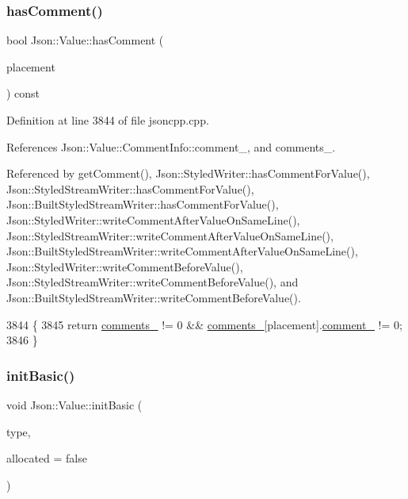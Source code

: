 \subsubsection{\texorpdfstring{has\+Comment()}{hasComment()}}
{\footnotesize\ttfamily bool Json\+::\+Value\+::has\+Comment (\begin{DoxyParamCaption}\item[{\hyperlink{namespace_json_a4fc417c23905b2ae9e2c47d197a45351}{Comment\+Placement}}]{placement }\end{DoxyParamCaption}) const}



Definition at line 3844 of file jsoncpp.\+cpp.



References Json\+::\+Value\+::\+Comment\+Info\+::comment\+\_\+, and comments\+\_\+.



Referenced by get\+Comment(), Json\+::\+Styled\+Writer\+::has\+Comment\+For\+Value(), Json\+::\+Styled\+Stream\+Writer\+::has\+Comment\+For\+Value(), Json\+::\+Built\+Styled\+Stream\+Writer\+::has\+Comment\+For\+Value(), Json\+::\+Styled\+Writer\+::write\+Comment\+After\+Value\+On\+Same\+Line(), Json\+::\+Styled\+Stream\+Writer\+::write\+Comment\+After\+Value\+On\+Same\+Line(), Json\+::\+Built\+Styled\+Stream\+Writer\+::write\+Comment\+After\+Value\+On\+Same\+Line(), Json\+::\+Styled\+Writer\+::write\+Comment\+Before\+Value(), Json\+::\+Styled\+Stream\+Writer\+::write\+Comment\+Before\+Value(), and Json\+::\+Built\+Styled\+Stream\+Writer\+::write\+Comment\+Before\+Value().


\begin{DoxyCode}
3844                                                        \{
3845   \textcolor{keywordflow}{return} \hyperlink{class_json_1_1_value_a2016564cabc7a29208e97bd0b782a4e4}{comments\_} != 0 && \hyperlink{class_json_1_1_value_a2016564cabc7a29208e97bd0b782a4e4}{comments\_}[placement].\hyperlink{struct_json_1_1_value_1_1_comment_info_a020f19c7098bab8ec8fec14cd1a5afb9}{comment\_} != 0;
3846 \}
\end{DoxyCode}
\mbox{\label{class_json_1_1_value_a32b86b71564157f40f880f5736be822a}} 
\subsubsection{\texorpdfstring{init\+Basic()}{initBasic()}}
{\footnotesize\ttfamily void Json\+::\+Value\+::init\+Basic (\begin{DoxyParamCaption}\item[{\hyperlink{namespace_json_a7d654b75c16a57007925868e38212b4e}{Value\+Type}}]{type,  }\item[{bool}]{allocated = {\ttfamily false} }\end{DoxyParamCaption})\hspace{0.3cm}{\ttfamily [private]}}



